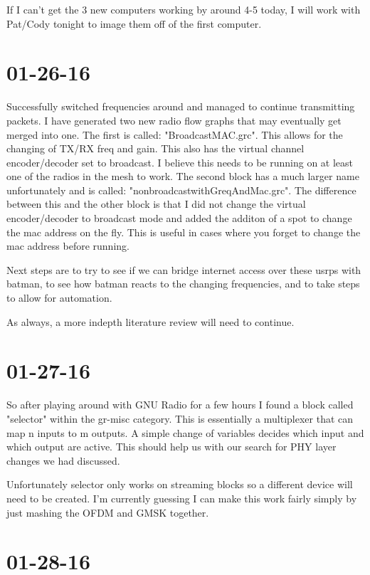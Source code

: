 \documentclass{article}
\begin{document}
{	If I can't get the 3 new computers working by around 4-5 today, I will work with Pat/Cody tonight to image them off of the first computer. 

	\section{01-26-16}

	Successfully switched frequencies around and managed to continue transmitting packets. I have generated two new radio flow graphs that may eventually get merged into one. The first is called:
"BroadcastMAC.grc". This allows for the changing of TX/RX freq and gain. This also has the virtual 
channel encoder/decoder set to broadcast. I believe this needs to be running on at least one of the
radios in the mesh to work. The second block has a much larger name unfortunately and is called:
"nonbroadcastwithGreqAndMac.grc". The difference between this and the other block is that I did not
change the virtual encoder/decoder to broadcast mode and added the additon of a spot to change
the mac address on the fly. This is useful in cases where you forget to change the mac address
before running. 

Next steps are to try to see if we can bridge internet access over these usrps with batman, to see
how batman reacts to the changing frequencies, and to take steps to allow for automation. 

As always, a more indepth literature review will need to continue. 
	
	\section{01-27-16}

	So after playing around with GNU Radio for a few hours I found a block called "selector" 
	within the gr-misc category. This is essentially a multiplexer that can map n inputs to 
	m outputs. A simple change of variables decides which input and which output are active. 
	This should help us with our search for PHY layer changes we had discussed. 

	Unfortunately selector only works on streaming blocks so a different device will need to be 
	created. I'm currently guessing I can make this work fairly simply by just mashing the OFDM
	and GMSK together.

	\section{01-28-16}

}
\end{document}
